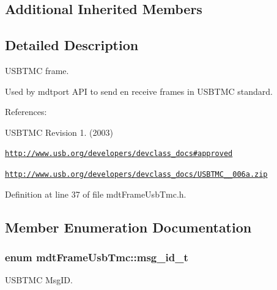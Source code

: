 \subsection*{Additional Inherited Members}


\subsection{Detailed Description}
U\-S\-B\-T\-M\-C frame. 

Used by mdtport A\-P\-I to send en receive frames in U\-S\-B\-T\-M\-C standard.

References\-:
\begin{DoxyItemize}
\item U\-S\-B\-T\-M\-C Revision 1. (2003)
\item \href{http://www.usb.org/developers/devclass_docs#approved}{\tt http\-://www.\-usb.\-org/developers/devclass\-\_\-docs\#approved}
\item \href{http://www.usb.org/developers/devclass_docs/USBTMC_1_006a.zip}{\tt http\-://www.\-usb.\-org/developers/devclass\-\_\-docs/\-U\-S\-B\-T\-M\-C\-\_\-\_\-006a.\-zip} 
\end{DoxyItemize}

Definition at line 37 of file mdt\-Frame\-Usb\-Tmc.\-h.



\subsection{Member Enumeration Documentation}
\hypertarget{classmdt_frame_usb_tmc_a10c2216157b0616b69f6cabc5c8e253b}{
\subsubsection[{msg\-\_\-id\-\_\-t}]{\setlength{\rightskip}{0pt plus 5cm}enum {\bf mdt\-Frame\-Usb\-Tmc\-::msg\-\_\-id\-\_\-t}}}\label{classmdt_frame_usb_tmc_a10c2216157b0616b69f6cabc5c8e253b}


U\-S\-B\-T\-M\-C Msg\-I\-D. 

